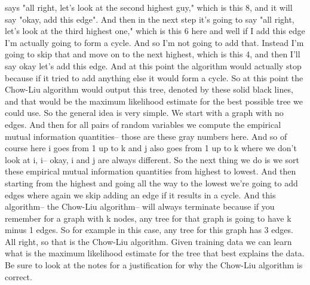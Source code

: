 says "all right, let's look at the second highest guy," which is this 8, and it will say "okay, add this edge". And then in the next step it's going to say "all right, let's look at the third highest one," which is this 6 here and well if I add this edge I'm actually going to form a cycle. And so I'm not going to add that. Instead I'm going to skip that and move on to the next highest, which is this 4, and then I'll say okay let's add this edge. And at this point the algorithm would actually stop because if it tried to add anything else it would form a cycle. So at this point the Chow-Liu algorithm would output this tree, denoted by these solid black lines, and that would be the maximum likelihood estimate for the best possible tree we could use. So the general idea is very simple. We start with a graph with no edges. And then for all pairs of random variables we compute the empirical mutual information quantities-- those are these gray numbers here. And so of course here i goes from 1 up to k and j also goes from 1 up to k where we don't look at i, i-- okay, i and j are always different. So the next thing we do is we sort these empirical mutual information quantities from highest to lowest. And then starting from the highest and going all the way to the lowest we're going to add edges where again we skip adding an edge if it results in a cycle. And this algorithm-- the Chow-Liu algorithm-- will always terminate because if you remember for a graph with k nodes, any tree for that graph is going to have k minus 1 edges. So for example in this case, any tree for this graph has 3 edges. All right, so that is the Chow-Liu algorithm. Given training data we can learn what is the maximum likelihood estimate for the tree that best explains the data. Be sure to look at the notes for a justification for why the Chow-Liu algorithm is correct.


